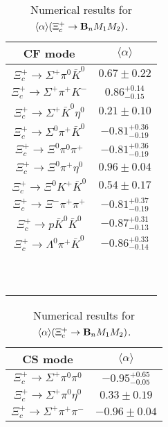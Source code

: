 \begin{table}
	\caption{Numerical results for 
		$\langle \alpha \rangle(\Xi_{c}^{+} \to {\bf B}_nM_1M_2)$.}\label{apre_Xicp}
	{\scriptsize 
		\begin{tabular}{|c|c|}
			\hline
			CF mode& $\langle \alpha \rangle$\\
			\hline
			$\Xi_{c}^{+} \to  \Sigma^{+} \pi^{0} \bar{K}^{0} $ & $       0.67 \pm       0.22 $ \\
			$\Xi_{c}^{+} \to  \Sigma^{+} \pi^{+} K^{-} $ & $       0.86 ^{+0.14}_{-0.15} $ \\
			$\Xi_{c}^{+} \to  \Sigma^{+} \bar{K}^{0} \eta^{0} $ & $       0.21 \pm       0.10 $ \\
			$\Xi_{c}^{+} \to  \Sigma^{0} \pi^{+} \bar{K}^{0} $ & $      -0.81 ^{+0.36}_{-0.19} $ \\
			$\Xi_{c}^{+} \to  \Xi^{0} \pi^{0} \pi^{+} $ & $      -0.81 ^{+0.36}_{-0.19}$ \\
			$\Xi_{c}^{+} \to  \Xi^{0} \pi^{+} \eta^{0} $ & $       0.96 \pm       0.04 $ \\
			$\Xi_{c}^{+} \to  \Xi^{0} K^{+} \bar{K}^{0} $ & $       0.54 \pm       0.17 $ \\
			$\Xi_{c}^{+} \to \Xi^{-} \pi^{+} \pi^{+} $ & $      -0.81 ^{+0.37}_{-0.19}$ \\
			$\Xi_{c}^{+} \to  p \bar{K}^{0} \bar{K}^{0} $ & $      -0.87^{+0.31}_{-0.13} $ \\
			$\Xi_{c}^{+} \to  \Lambda^{0} \pi^{+} \bar{K}^{0} $ & $      -0.86^{+0.33}_{-0.14} $ \\
			&\\	
			&\\	
			&\\	
			&\\	
			&\\	
			&\\	
			&\\	
			&\\	
			&\\	
			&\\	
			\hline
		\end{tabular}
		\begin{tabular}{|c|c|}
			\hline
			CS mode& $\langle \alpha \rangle$\\
			\hline
			$\Xi_{c}^{+} \to  \Sigma^{+} \pi^{0} \pi^{0} $ & $      -0.95 ^{+0.65}_{-0.05} $ \\
			$\Xi_{c}^{+} \to  \Sigma^{+} \pi^{0} \eta^{0} $ & $       0.33 \pm       0.19 $ \\
			$\Xi_{c}^{+} \to  \Sigma^{+} \pi^{+} \pi^{-} $ & $      -0.96 \pm       0.04 $ \\

\end{tabular}}
\end{table}
